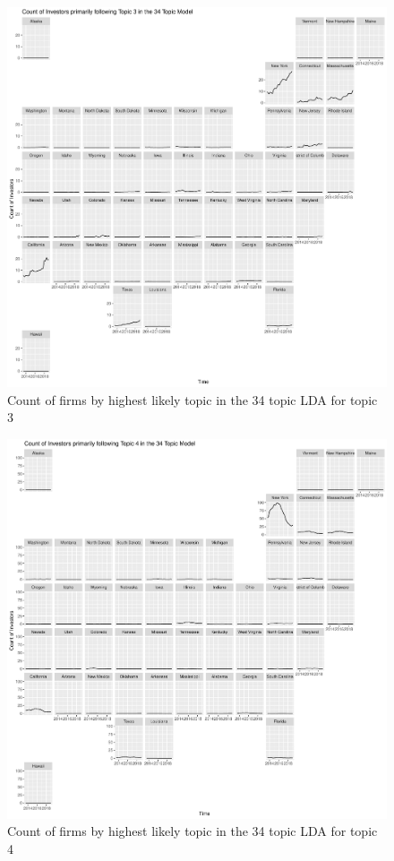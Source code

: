 		\begin{figure}
		\centering
		\includegraphics[width=1\linewidth]{Figures/ChapterV/USA_34_Topic03.pdf}
		\caption[Count of Firms for Topic 3 by Quarter]{Count of firms by highest likely topic in the 34 topic LDA for topic 3}
		\label{fig:StateLDA3}
	\end{figure}
	
		\begin{figure}
		\centering
		\includegraphics[width=1\linewidth]{Figures/ChapterV/USA_34_Topic04.pdf}
		\caption[Count of Firms for Topic 4 by Quarter]{Count of firms by highest likely topic in the 34 topic LDA for topic 4}
		\label{fig:StateLDA4}
	\end{figure}
	
